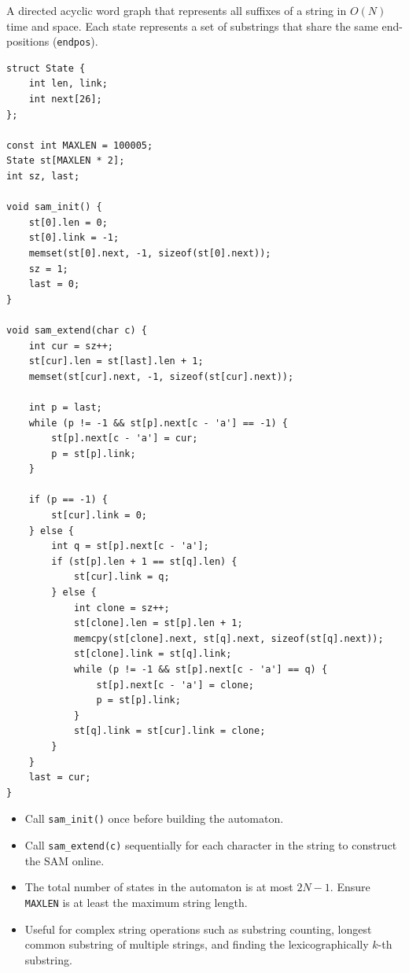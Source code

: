 
A directed acyclic word graph that represents all suffixes of a string in $O(N)$ time and space. Each state represents a set of substrings that share the same end-positions (\lstinline|endpos|).

\begin{lstlisting}
struct State {
    int len, link;
    int next[26];
};

const int MAXLEN = 100005;
State st[MAXLEN * 2];
int sz, last;

void sam_init() {
    st[0].len = 0;
    st[0].link = -1;
    memset(st[0].next, -1, sizeof(st[0].next));
    sz = 1;
    last = 0;
}

void sam_extend(char c) {
    int cur = sz++;
    st[cur].len = st[last].len + 1;
    memset(st[cur].next, -1, sizeof(st[cur].next));
    
    int p = last;
    while (p != -1 && st[p].next[c - 'a'] == -1) {
        st[p].next[c - 'a'] = cur;
        p = st[p].link;
    }
    
    if (p == -1) {
        st[cur].link = 0;
    } else {
        int q = st[p].next[c - 'a'];
        if (st[p].len + 1 == st[q].len) {
            st[cur].link = q;
        } else {
            int clone = sz++;
            st[clone].len = st[p].len + 1;
            memcpy(st[clone].next, st[q].next, sizeof(st[q].next));
            st[clone].link = st[q].link;
            while (p != -1 && st[p].next[c - 'a'] == q) {
                st[p].next[c - 'a'] = clone;
                p = st[p].link;
            }
            st[q].link = st[cur].link = clone;
        }
    }
    last = cur;
}
\end{lstlisting}

\begin{itemize}
    \item Call \lstinline|sam_init()| once before building the automaton.
    \item Call \lstinline|sam_extend(c)| sequentially for each character in the string to construct the SAM online.
    \item The total number of states in the automaton is at most $2N - 1$. Ensure \lstinline|MAXLEN| is at least the maximum string length.
    \item Useful for complex string operations such as substring counting, longest common substring of multiple strings, and finding the lexicographically $k$-th substring.
\end{itemize}
